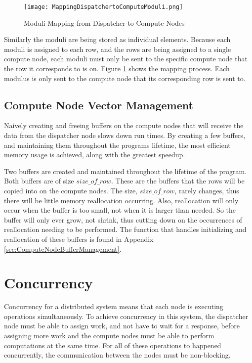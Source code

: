 \begin{figure}[t!]
\centering
\texttt{[image: MappingDispatchertoComputeModuli.png]}
\caption{Moduli Mapping from Dispatcher to Compute Nodes}
\label{fig:MappingDispatcherToComputeModuli}
\end{figure}
Similarly the moduli are being stored as individual elements. Because each moduli is assigned to each row, and the rows are being assigned to a single compute node, each moduli must only be sent to the specific compute node that the row it corresponds to is on. Figure \ref{fig:MappingDispatcherToComputeModuli} shows the mapping process. Each modulus is only sent to the compute node that its corresponding row is sent to.

\subsection{Compute Node Vector Management}
Naively creating and freeing buffers on the compute nodes that will receive the data from the dispatcher node slows down run times. By creating a few buffers, and maintaining them throughout the programs lifetime, the most efficient memory usage is achieved, along with the greatest speedup.

Two buffers are created and maintained throughout the lifetime of the program. Both buffers are of size $size\_of\_row$. These are the buffers that the rows will be copied into on the compute nodes. The size, $size\_of\_row$, rarely changes, thus there will be little memory reallocation occurring. Also, reallocation will only occur when the buffer is too small, not when it is larger than needed. So the buffer will only ever grow, not shrink, thus cutting down on the occurrences of reallocation needing to be performed. The function that handles initializing and reallocation of these buffers is found in Appendix \ref{sec:ComputeNodeBufferManagement}.

\section{Concurrency} \label{sec:Concurrency}
Concurrency for a distributed system means that each node is executing operations simultaneously. To achieve concurrency in this system, the dispatcher node must be able to assign work, and not have to wait for a response, before assigning more work and the compute nodes must be able to perform computations at the same time. For all of these operations to happened concurrently, the communication between the nodes must be non-blocking.

